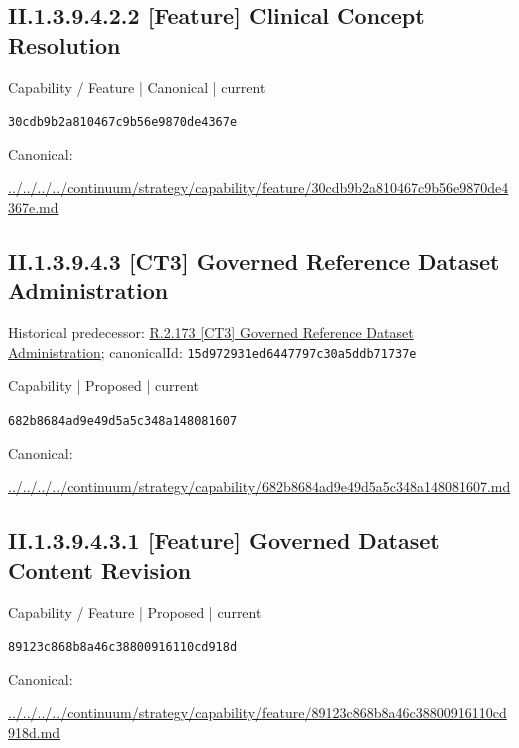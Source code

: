 \documentclass[10pt,a4paper]{article}
\begin{document}
\subsection*{II.1.3.9.4.2.2 [Feature] Clinical Concept Resolution}
\label{element-30cdb9b2a810467c9b56e9870de4367e}
{\small Capability / Feature | Canonical | current}\par
\texttt{30cdb9b2a810467c9b56e9870de4367e}\par
Canonical: \par
{\footnotesize\url{../../../../continuum/strategy/capability/feature/30cdb9b2a810467c9b56e9870de4367e.md}}\par
\subsection*{II.1.3.9.4.3 [CT3] Governed Reference Dataset Administration}
Historical predecessor: \hyperref[element-15d972931ed6447797c30a5ddb71737e]{R.2.173 [CT3] Governed Reference Dataset Administration}; canonicalId: \texttt{15d972931ed6447797c30a5ddb71737e}\par
\label{element-682b8684ad9e49d5a5c348a148081607}
{\small Capability | Proposed | current}\par
\texttt{682b8684ad9e49d5a5c348a148081607}\par
Canonical: \par
{\footnotesize\url{../../../../continuum/strategy/capability/682b8684ad9e49d5a5c348a148081607.md}}\par
\subsection*{II.1.3.9.4.3.1 [Feature] Governed Dataset Content Revision}
\label{element-89123c868b8a46c38800916110cd918d}
{\small Capability / Feature | Proposed | current}\par
\texttt{89123c868b8a46c38800916110cd918d}\par
Canonical: \par
{\footnotesize\url{../../../../continuum/strategy/capability/feature/89123c868b8a46c38800916110cd918d.md}}\par
\end{document}
